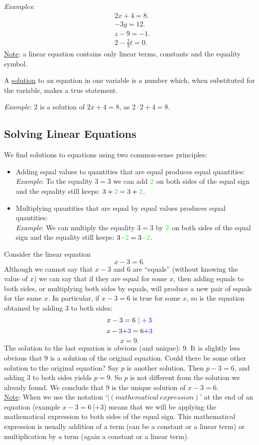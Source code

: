 \documentclass[12pt]{article}
\begin{document}
\textit{Examples}:
\begin{equation*}
\begin{split}
& 2x +4=8.\\
& -3y = 12.\\
&  z - 9 = -1.\\
& 2-\frac{2}{3}t=0.
\end{split}
\end{equation*}
\underline{Note}: a linear equation contains only linear terms, constants and the equality symbol.

A \underline{solution} to an equation in one variable is a number which, when substituted for the variable,
makes a true statement.

\textit{Example}: $2$ is a solution of $2x +4=8$, as $2\cdot 2+4=8$.

\subsection{Solving Linear Equations}
We find solutions to equations using two common-sense principles:
\begin{itemize}
\item Adding equal values to quantities that are equal produces equal quantities:\\
\textit{Example}: To the equality $3=3$ we can add $\textcolor{green}{2}$ on both sides of the equal sign and the equality still keeps: $3+\textcolor{green}{2}=3+\textcolor{green}{2}$.
\item Multiplying quantities that are equal by equal values produces equal quantities:\\
\textit{Example}: We can multiply the equality $3=3$ by $\textcolor{green}{2}$ on both sides of the equal sign and the equality still keeps: $3\cdot \textcolor{green}{2}=3\cdot \textcolor{green}{2}$.
\end{itemize} 
Consider the linear equation
$$x - 3 = 6.$$
Although we cannot say that $x - 3$ and $6$ are “equals” (without knowing the value of $x$) we can say
that if they are equal for some $x$, then adding equals to both sides, or multiplying both sides by equals,
will produce a new pair of equals for the same $x$. In particular, if $x - 3 = 6$ is true for some $x$, so is the equation obtained by adding $3$ to both sides:
$$x-3=6 \textcolor{blue}{\ |+3}$$
$$x-3\textcolor{blue}{+3}=6\textcolor{blue}{+3}$$
$$x=9.$$
The solution to the last equation is obvious (and unique): $9$. It is slightly less obvious that $9$ is a solution of the original equation.  Could there be some other solution to the original equation? Say $p$ is another solution. Then $p-3 = 6$, and adding $3$ to both sides yields $p = 9$. So $p$ is not different from the solution we already found. We conclude that $9$ is the unique solution of $x - 3 = 6$.\\
\underline{Note}: When we use the notation `$| (mathematical \ expression)$' at the end of an equation (example $x-3=6 \ |+3$) means that we will be applying the mathematical expression to both sides of the equal sign. This mathematical expression is usually addition of a term (can be a constant or a linear term) or multiplication by a term (again a constant or a linear term). 
\end{document}
